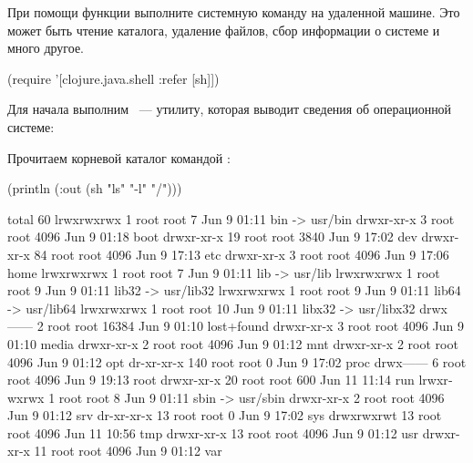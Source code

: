 При помощи функции  выполните системную команду на удаленной машине. Это может быть чтение каталога, удаление файлов, сбор информации о системе и много другое.

\begin{english}
  \begin{clojure}
(require '[clojure.java.shell :refer [sh]])
  \end{clojure}
\end{english}

Для начала выполним ~--- утилиту, которая выводит сведения об операционной системе:

\begin{english}
\end{english}

Прочитаем корневой каталог командой :

\begin{english}
  \begin{text}
(println (:out (sh "ls" "-l" "/")))

total 60
lrwxrwxrwx   1 root root     7 Jun  9 01:11 bin -> usr/bin
drwxr-xr-x   3 root root  4096 Jun  9 01:18 boot
drwxr-xr-x  19 root root  3840 Jun  9 17:02 dev
drwxr-xr-x  84 root root  4096 Jun  9 17:13 etc
drwxr-xr-x   3 root root  4096 Jun  9 17:06 home
lrwxrwxrwx   1 root root     7 Jun  9 01:11 lib -> usr/lib
lrwxrwxrwx   1 root root     9 Jun  9 01:11 lib32 -> usr/lib32
lrwxrwxrwx   1 root root     9 Jun  9 01:11 lib64 -> usr/lib64
lrwxrwxrwx   1 root root    10 Jun  9 01:11 libx32 -> usr/libx32
drwx------   2 root root 16384 Jun  9 01:10 lost+found
drwxr-xr-x   3 root root  4096 Jun  9 01:10 media
drwxr-xr-x   2 root root  4096 Jun  9 01:12 mnt
drwxr-xr-x   2 root root  4096 Jun  9 01:12 opt
dr-xr-xr-x 140 root root     0 Jun  9 17:02 proc
drwx------   6 root root  4096 Jun  9 19:13 root
drwxr-xr-x  20 root root   600 Jun 11 11:14 run
lrwxrwxrwx   1 root root     8 Jun  9 01:11 sbin -> usr/sbin
drwxr-xr-x   2 root root  4096 Jun  9 01:12 srv
dr-xr-xr-x  13 root root     0 Jun  9 17:02 sys
drwxrwxrwt  13 root root  4096 Jun 11 10:56 tmp
drwxr-xr-x  13 root root  4096 Jun  9 01:12 usr
drwxr-xr-x  11 root root  4096 Jun  9 01:12 var
  \end{text}
\end{english}

